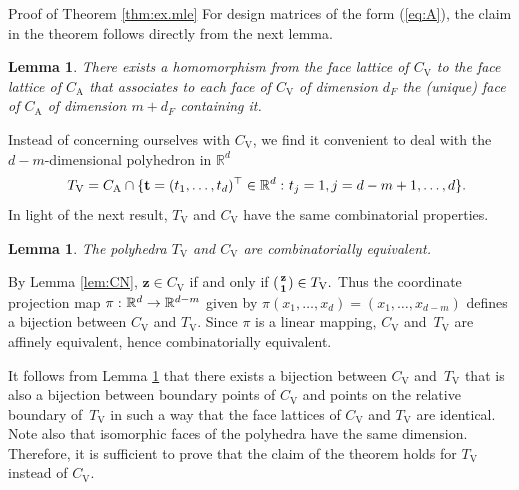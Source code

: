 \documentclass[aos,MSNbibl,nameyear,dvips]{arximspdf}
\newtheorem{lemma}[theorem]{Lemma}
\newcommand{\m}[1]{\mathrm{#1}}
\newcommand{\bft}{\mathbf{t}}
\newcommand{\bfz}{\mathbf{z}}
\newcommand{\eqref}[1]{(\ref{#1})}
\begin{document}
\begin{appendix}
\begin{pf*}{Proof of Theorem \ref{thm:ex.mle}}
For design matrices of the form \eqref{eq:A}, the claim in the theorem
follows directly from the next lemma.

\begin{lemma}\label{ref:homo}
There exists a homomorphism from the face lattice of $C_{\m{V}}$ to the
face lattice of $C_{\m{A}}$ that associates to each face of $C_{\m{V}}$
of dimension $d_F$ the (unique) face of $C_{\m{A}}$ of dimension $m +
d_F$ containing it.
\end{lemma}

\begin{pf}
Instead of concerning ourselves with $C_{\m{V}}$, we find it convenient
to deal with the $d - m$-dimensional polyhedron in $\mathbb{R}^d$
%
\begin{equation}\label{eq:TN}\quad
T_{\m{V}} = C_{\m{A}} \cap\{ \bft= (t_1,\ldots,t_d)^\top\in
\mathbb{R}^d \dvtx  t_j = 1, j = d-m + 1,\ldots, d\}.
\end{equation}
%
In light of the next result, $T_{\m{V}}$ and $C_{\m{V}}$ have the same
combinatorial properties.

\begin{lemma}\label{lem:CN.TN}
The polyhedra $T_{\m{V}}$ and $C_{\m{V}}$ are combinatorially
equivalent. %
\end{lemma}

\begin{pf}
By Lemma \ref{lem:CN}, $\bfz\in C_{\m{V}}$ if and only if
$
 (
{{\bfz} \atop {\mathbf{1}}}
%
 ) \in T_{\m{V}}.
$ Thus the coordinate projection map $\pi\dvtx \mathbb{R}^d
\rightarrow\mathbb{R}^{d-m}$ given by $\pi(x_1,\ldots,x_d) =
(x_{1},\ldots,x_{d-m})$ defines a bijection between $C_{\m{V}}$ and
$T_{\m{V}}$. Since $\pi$ is a linear mapping, $C_{\m{V}}$ and~$T_{\m{V}}$ are affinely equivalent, hence combinatorially equivalent.
\end{pf}

It follows from Lemma \ref{lem:CN.TN} that there exists a bijection
between $C_{\m{V}}$ and~$T_{\m{V}}$ that is also a bijection between
boundary points of $C_{\m{V}}$ and points on the relative boundary of~$T_{\m{V}}$ in such a way that the face lattices of $C_{\m{V}}$ and
$T_{\m{V}}$ are identical. Note also that isomorphic faces of the
polyhedra have the same dimension. Therefore, it is sufficient to prove
that the claim of the theorem holds for $T_{\m{V}}$ instead of
$C_{\m{V}}$.


\end{pf}
\end{pf*}
\end{appendix}
\end{document}
